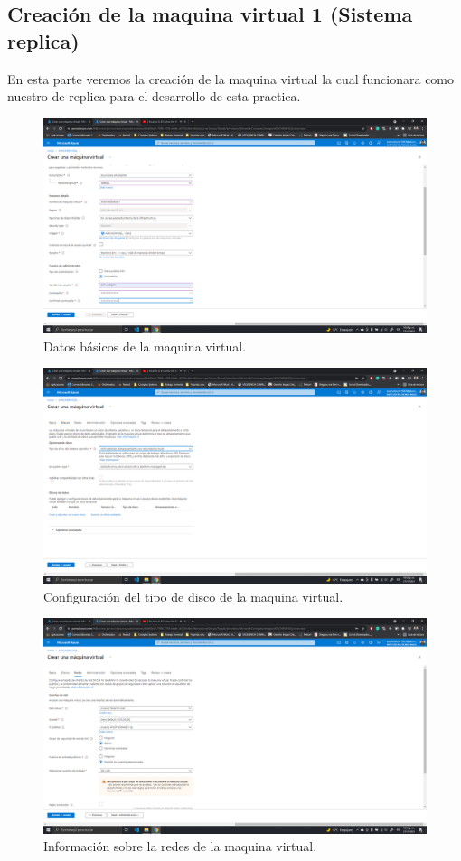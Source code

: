 \documentclass[11pt]{article}
\begin{document}
		\subsection{Creación de la maquina virtual 1 (Sistema replica)}
En esta parte veremos la creación de la maquina virtual la cual funcionara como nuestro de replica para el desarrollo de esta practica.
		\begin{figure}[H]
			\centering
			\includegraphics[scale=0.34]{resources/Infobasica1.png}
			\caption{Datos básicos de la maquina virtual.}\label{fig:picture}
		\end{figure}
		\begin{figure}[H]
			\centering
			\includegraphics[scale=0.34]{resources/disco1.png}
			\caption{Configuración del tipo de disco de la maquina virtual.}\label{fig:picture}
		\end{figure}
		\begin{figure}[H]
			\centering
			\includegraphics[scale=0.34]{resources/redes1.png}
			\caption{Información sobre la redes de la maquina virtual.}\label{fig:picture}
		\end{figure}
\end{document}
